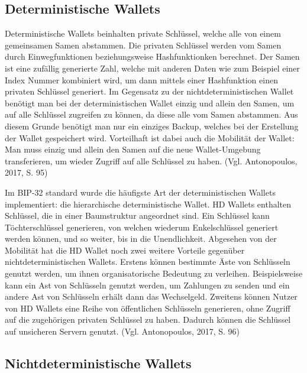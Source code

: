 \subsection{Deterministische Wallets}
Deterministische Wallets beinhalten private Schlüssel, welche alle von einem gemeinsamen Samen abstammen. Die privaten Schlüssel
werden vom Samen durch Einwegfunktionen beziehungsweise Hashfunktionken berechnet. Der Samen ist eine zufällig generierte Zahl,
welche mit anderen Daten wie zum Beispiel einer Index Nummer kombiniert wird, um dann mittels einer Hashfunktion einen privaten
Schlüssel generiert. Im Gegensatz zu der nichtdeterministischen Wallet benötigt man bei der deterministischen Wallet einzig und 
allein den Samen, um auf alle Schlüssel zugreifen zu können, da diese alle vom Samen abstammen. Aus diesem Grunde benötigt man
nur ein einziges Backup, welches bei der Erstellung der Wallet gespeichert wird. Vorteilhaft ist dabei auch die Mobilität der
Wallet: Man muss einzig und allein den Samen auf die neue Wallet-Umgebung transferieren, um wieder Zugriff auf alle Schlüssel
zu haben. (Vgl. Antonopoulos, 2017, S. 95)

Im BIP-32 standard wurde die häufigste Art der deterministischen Wallets implementiert: die hierarchische deterministische Wallet.
HD Wallets enthalten Schlüssel, die in einer Baumstruktur angeordnet sind. Ein Schlüssel kann Töchterschlüssel generieren, von 
welchen wiederum Enkelschlüssel generiert werden können, und so weiter, bis in die Unendlichkeit. Abgesehen von der Mobilität
hat die HD Wallet noch zwei weitere Vorteile gegenüber nichtdeterministischen Wallets. Erstens können bestimmte Äste von
Schlüsseln genutzt werden, um ihnen organisatorische Bedeutung zu verleihen. Beispielsweise kann ein Ast von Schlüsseln genutzt
werden, um Zahlungen zu senden und ein andere Ast von Schlüsseln erhält dann das Wechselgeld. Zweitens können Nutzer von HD
Wallets eine Reihe von öffentlichen Schlüsseln generieren, ohne Zugriff auf die zugehörigen privaten Schlüssel zu haben. Dadurch 
können die Schlüssel auf unsicheren Servern genutzt. (Vgl. Antonopoulos, 2017, S. 96)


\subsection{Nichtdeterministische Wallets}

